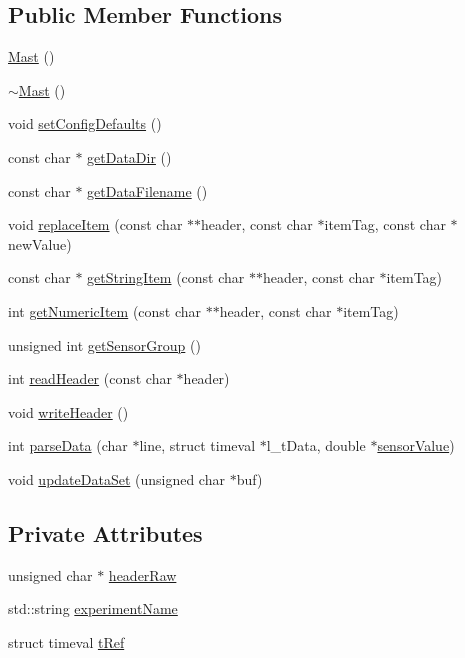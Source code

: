 \subsection*{Public Member Functions}
\begin{DoxyCompactItemize}
\item 
\hyperlink{classMast_aa398ff904c307faa36b4010e8a9beaaf}{Mast} ()
\item 
\hyperlink{classMast_a1dc94280c9f342657d40d1fb9c4db637}{$\sim$\-Mast} ()
\item 
void \hyperlink{classMast_a0dd0878ebcdb7ef0fe4806cafe4deaff}{set\-Config\-Defaults} ()
\item 
const char $\ast$ \hyperlink{classMast_a728e5f3077a08c7fec100cc8792a1de6}{get\-Data\-Dir} ()
\item 
const char $\ast$ \hyperlink{classMast_af1019b85d2e451e9a57bf9da0638d69e}{get\-Data\-Filename} ()
\item 
void \hyperlink{classMast_a978e895ec47d4566a32e4ef46ba594ea}{replace\-Item} (const char $\ast$$\ast$header, const char $\ast$item\-Tag, const char $\ast$new\-Value)
\item 
const char $\ast$ \hyperlink{classMast_a881666b8f32cc6709163498b386b1abb}{get\-String\-Item} (const char $\ast$$\ast$header, const char $\ast$item\-Tag)
\item 
int \hyperlink{classMast_aee4436557c43cc557f647ee814e291ea}{get\-Numeric\-Item} (const char $\ast$$\ast$header, const char $\ast$item\-Tag)
\item 
unsigned int \hyperlink{classMast_a3aa4d13cae485f7123ed52009142f45e}{get\-Sensor\-Group} ()
\item 
int \hyperlink{classMast_aa58ccf139807b76c5433ddb61b4a274a}{read\-Header} (const char $\ast$header)
\item 
void \hyperlink{classMast_a415c39dd4df43ae2153a6c2d0f4ec718}{write\-Header} ()
\item 
int \hyperlink{classMast_a9d6b848916200b80dfd294c1ab3d42fe}{parse\-Data} (char $\ast$line, struct timeval $\ast$l\-\_\-t\-Data, double $\ast$\hyperlink{classDAQDevice_ad148188c57598fdf4fd4c1c333aeb0d8}{sensor\-Value})
\item 
void \hyperlink{classMast_a41f1bc2262c34256418bb6f812743d42}{update\-Data\-Set} (unsigned char $\ast$buf)
\end{DoxyCompactItemize}
\subsection*{Private Attributes}
\begin{DoxyCompactItemize}
\item 
unsigned char $\ast$ \hyperlink{classMast_a6d78405738d46bae9b1a1d6e11618ed0}{header\-Raw}
\item 
std\-::string \hyperlink{classMast_a6873ed24c0dad777ddcf003407c1a1cd}{experiment\-Name}
\item 
struct timeval \hyperlink{classMast_a051130b8ab23a021b45e7a1da9681ca2}{t\-Ref}
\end{DoxyCompactItemize}

